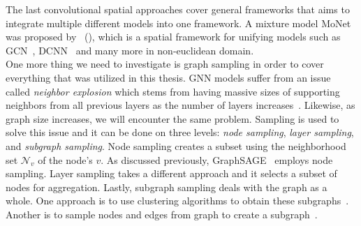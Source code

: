 The last convolutional spatial approaches cover general frameworks that aims to integrate multiple different models into one framework. A mixture model MoNet was proposed by~\cite{GeometricDeepLearningOnGraphsAndManifolds_Monti} (\citeyear{GeometricDeepLearningOnGraphsAndManifolds_Monti}), which is a spatial framework for unifying models such as GCN~\parencite{GCN_Kipf}, DCNN~\parencite{DCNN_Atwood} and many more in non-euclidean domain.\\
One more thing we need to investigate is graph sampling in order to cover everything that was utilized in this thesis. GNN models suffer from an issue called \emph{neighbor explosion} which stems from having massive sizes of supporting neighbors from all previous layers as the number of layers increases~\cite{GNNsAReview_Zhou}. Likewise, as graph size increases, we will encounter the same problem. Sampling is used to solve this issue and it can be done on three levels: \emph{node sampling}, \emph{layer sampling}, and \emph{subgraph sampling}. Node sampling creates a subset using the neighborhood set $\mathcal{N}_v$ of the node's $v$. As discussed previously, GraphSAGE~\parencite{GraphSAGE_Hamilton} employs node sampling. Layer sampling takes a different approach and it selects a subset of nodes for aggregation. Lastly, subgraph sampling deals with the graph as a whole. One approach is to use clustering algorithms to obtain these subgraphs~\parencite{ClusterGCN_Chiang}. Another is to sample nodes and edges from graph to create a subgraph~\parencite{GraphSAINT_Zeng}.\\


